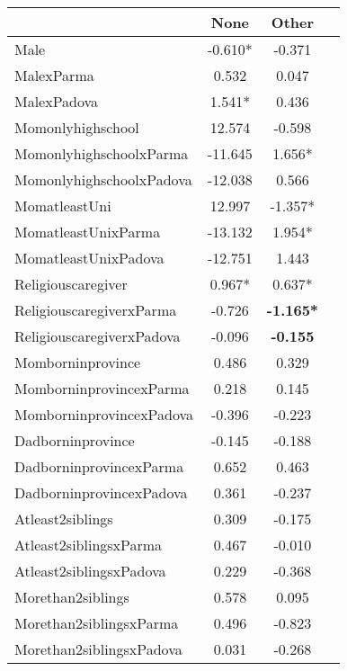 \begin{tabular}{l c c c}
\toprule
& None & Other \\
\midrule
Male & -0.610* &    -0.371 \\
MalexParma &     0.532 &     0.047 \\
MalexPadova & 1.541* &     0.436 \\
Momonlyhighschool &    12.574 &    -0.598 \\
MomonlyhighschoolxParma &   -11.645 & 1.656* \\
MomonlyhighschoolxPadova &   -12.038 &     0.566 \\
MomatleastUni &    12.997 & -1.357* \\
MomatleastUnixParma &   -13.132 & 1.954* \\
MomatleastUnixPadova &   -12.751 &     1.443 \\
Religiouscaregiver & 0.967* & 0.637* \\
ReligiouscaregiverxParma &    -0.726 & \textbf{-1.165*} \\
ReligiouscaregiverxPadova &    -0.096 & \textbf{   -0.155} \\
Momborninprovince &     0.486 &     0.329 \\
MomborninprovincexParma &     0.218 &     0.145 \\
MomborninprovincexPadova &    -0.396 &    -0.223 \\
Dadborninprovince &    -0.145 &    -0.188 \\
DadborninprovincexParma &     0.652 &     0.463 \\
DadborninprovincexPadova &     0.361 &    -0.237 \\
Atleast2siblings &     0.309 &    -0.175 \\
Atleast2siblingsxParma &     0.467 &    -0.010 \\
Atleast2siblingsxPadova &     0.229 &    -0.368 \\
Morethan2siblings &     0.578 &     0.095 \\
Morethan2siblingsxParma &     0.496 &    -0.823 \\
Morethan2siblingsxPadova &     0.031 &    -0.268 \\
\bottomrule
\end{tabular}
